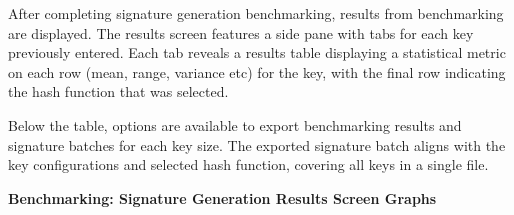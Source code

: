 \documentclass[]{final_report}
\begin{document}
After completing signature generation benchmarking, results from benchmarking are displayed. The results screen features a side pane with tabs for each key previously entered. Each tab reveals a results table displaying a statistical metric on each row (mean, range, variance etc) for the key, with the final row indicating the hash function that was selected.


Below the table, options are available to export benchmarking results and signature batches for each key size. The exported signature batch aligns with the key configurations and selected hash function, covering all keys in a single file.

\newpage
\textbf{Benchmarking: Signature Generation Results Screen Graphs}

\begin{figure}[H]
    \centering %
    

\end{figure}
\end{document}

